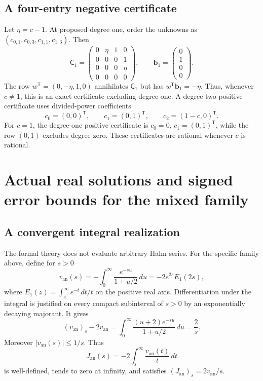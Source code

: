 \documentclass[11pt,a4paper]{article}
\numberwithin{equation}{section}
\theoremstyle{definition}
\theoremstyle{remark}\newtheorem{remark}[theorem]{Remark}
\begin{document}
\subsection{A four-entry negative certificate}
Let $\eta=c-1$. At proposed degree one, order the unknowns as
$(c_{0,1},c_{0,3},c_{1,1},c_{1,3})$. Then
\begin{equation}
 \mathsf C_1=
 \begin{pmatrix}
 0&\eta&1&0\\
 0&0&0&1\\
 0&0&0&\eta\\
 0&0&0&0
 \end{pmatrix},\qquad
 \mathbf b_1=\begin{pmatrix}0\\1\\0\\0\end{pmatrix}.
 \label{eq:mixedcert}
\end{equation}
The row $w^{\mathsf T}=(0,-\eta,1,0)$ annihilates $\mathsf C_1$ but has
$w^{\mathsf T}\mathbf b_1=-\eta$. Thus, whenever $c\ne1$, this is an exact certificate excluding degree one. A degree-two positive certificate uses divided-power coefficients
\[
 c_0=(0,0)^{\mathsf T},\qquad
 c_1=(0,1)^{\mathsf T},\qquad
 c_2=(1-c,0)^{\mathsf T}.
\]
For $c=1$, the degree-one positive certificate is $c_0=0$, $c_1=(0,1)^{\mathsf T}$, while the row $(0,1)$ excludes degree zero. These certificates are rational whenever $c$ is rational.

\section{Actual real solutions and signed error bounds for the mixed family}
\label{sec:analytic}
\subsection{A convergent integral realization}
The formal theory does not evaluate arbitrary Hahn series. For the specific family above, define for $s>0$
\begin{equation}
 v_{\mathrm{an}}(s)=-\int_0^\infty
       \frac{e^{-su}}{1+u/2}\,du
       =-2e^{2s}E_1(2s),
 \label{eq:van}
\end{equation}
where $E_1(z)=\int_z^\infty e^{-t}\,dt/t$ on the positive real axis. Differentiation under the integral is justified on every compact subinterval of $s>0$ by an exponentially decaying majorant. It gives
\[
 (v_{\mathrm{an}})_s-2v_{\mathrm{an}}
 =\int_0^\infty\frac{(u+2)e^{-su}}{1+u/2}\,du
 =\frac2s.
\]
Moreover $|v_{\mathrm{an}}(s)|\le1/s$. Thus
\begin{equation}
 J_{\mathrm{an}}(s)=-2\int_s^\infty
                  \frac{v_{\mathrm{an}}(t)}{t}\,dt
 \label{eq:Jan}
\end{equation}
is well-defined, tends to zero at infinity, and satisfies
$(J_{\mathrm{an}})_s=2v_{\mathrm{an}}/s$.
\end{document}
